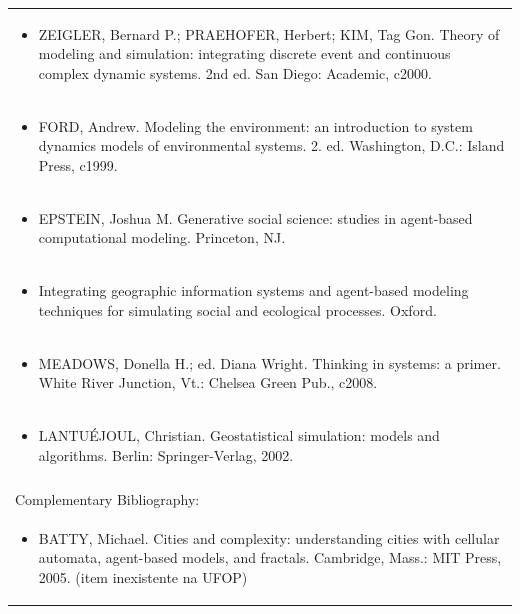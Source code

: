\documentclass[11pt]{article}
\begin{document}
\begin{center}
\begin{longtable}{|p{4cm}|p{4cm}|p{4cm}|p{4cm}|}
\multicolumn{4}{|p{\dimexpr 16cm + 6\tabcolsep\relax}|}{\begin{itemize}\item ZEIGLER, Bernard P.; PRAEHOFER, Herbert; KIM, Tag Gon. Theory of modeling and simulation: integrating discrete event and continuous complex dynamic systems. 2nd ed. San Diego: Academic, c2000.\end{itemize}}\\
\multicolumn{4}{|p{\dimexpr 16cm + 6\tabcolsep\relax}|}{\begin{itemize}\item FORD, Andrew. Modeling the environment: an introduction to system dynamics models of environmental systems. 2. ed. Washington, D.C.: Island Press, c1999.\end{itemize}}\\
\multicolumn{4}{|p{\dimexpr 16cm + 6\tabcolsep\relax}|}{\begin{itemize}\item EPSTEIN, Joshua M. Generative social science: studies in agent-based computational modeling. Princeton, NJ.\end{itemize}}\\
\multicolumn{4}{|p{\dimexpr 16cm + 6\tabcolsep\relax}|}{\begin{itemize}\item Integrating geographic information systems and agent-based modeling techniques for simulating social and ecological processes. Oxford.\end{itemize}}\\
\multicolumn{4}{|p{\dimexpr 16cm + 6\tabcolsep\relax}|}{\begin{itemize}\item MEADOWS, Donella H.; ed. Diana Wright. Thinking in systems: a primer. White River Junction, Vt.: Chelsea Green Pub., c2008.\end{itemize}}\\
\multicolumn{4}{|p{\dimexpr 16cm + 6\tabcolsep\relax}|}{\begin{itemize}\item LANTUÉJOUL, Christian. Geostatistical simulation: models and algorithms. Berlin: Springer-Verlag, 2002.\end{itemize}}\\
\multicolumn{4}{|p{16cm}|}{}\\
\hline
\multicolumn{4}{|p{16cm}|}{Complementary Bibliography:}\\*
\multicolumn{4}{|p{\dimexpr 16cm + 6\tabcolsep\relax}|}{\begin{itemize}\item BATTY, Michael. Cities and complexity: understanding cities with cellular automata, agent-based models, and fractals. Cambridge, Mass.: MIT Press, 2005. (item inexistente na UFOP)\end{itemize}}\\

\end{longtable}
\end{center}
\end{document}

